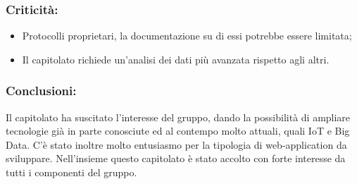 	\subsubsection{Criticità:}
		\begin{itemize}
			\item Protocolli proprietari, la documentazione su di essi potrebbe essere limitata;
			\item Il capitolato richiede un'analisi dei dati più avanzata rispetto agli altri.
		\end{itemize}
		
	\subsubsection{Conclusioni:}
		Il capitolato ha suscitato l'interesse del gruppo, dando la possibilità di ampliare tecnologie già in parte conosciute ed al contempo molto attuali, quali IoT e Big Data. C'è stato inoltre molto entusiasmo per la tipologia di web-application da sviluppare. Nell'insieme questo capitolato è stato accolto con forte interesse da tutti i componenti del gruppo.

